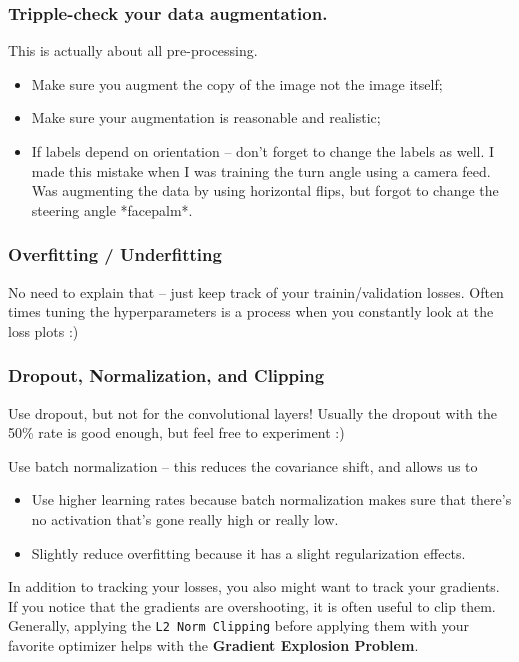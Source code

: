 \subsubsection*{Tripple-check your data augmentation.}
This is actually about all pre-processing.
\begin{itemize}
\item Make sure you augment the copy of the image not the image itself;
\item Make sure your augmentation is reasonable and realistic;
\item If labels depend on orientation -- don't forget to change the labels as well. I made this mistake when I was training the turn angle using a camera feed. Was augmenting the data by using horizontal flips, but forgot to change the steering angle *facepalm*.
\end{itemize}


\subsubsection*{Overfitting / Underfitting}
No need to explain that -- just keep track of your trainin/validation losses.
Often times tuning the hyperparameters is a process when you constantly look at the loss plots :)

\subsubsection*{Dropout, Normalization, and Clipping}
Use dropout, but not for the convolutional layers!
Usually the dropout with the 50\% rate is good enough, but feel free to experiment :)

Use batch normalization -- this reduces the covariance shift, and allows us to
\begin{itemize}
\item Use higher learning rates because batch normalization makes sure that there’s no activation that’s gone really high or really low.
\item Slightly reduce overfitting because it has a slight regularization effects.
\end{itemize}

In addition to tracking your losses, you also might want to track your gradients.
If you notice that the gradients are overshooting, it is often useful to clip them.
Generally, applying the \texttt{L2 Norm Clipping} before applying them with your favorite optimizer helps with the {\bf Gradient Explosion Problem}.

